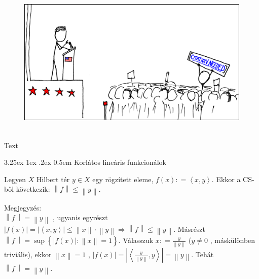 \documentclass[12pt,a4paper]{scrartcl}
\makeatletter
\renewcommand\paragraph{\@startsection{paragraph}{4}{\z@}%
                                    {3.25ex \@plus1ex \@minus.2ex}%
                                    {0.5em} %
                                    {\normalfont\normalsize\bfseries}}
\newenvironment{megjegyzes}{}{}
\newenvironment{ajanlofig}{\begin{figure}\begin{center}}{
\end{center}\end{figure}}
\makeatother
\begin{document}
\begin{ajanlo}

\begin{ajanlofig}

\href{https://xkcd.com}{\includegraphics[width=5.20833in,height=2.82292in]{wikipedian_protester.png}}

\end{ajanlofig}

Text

\end{ajanlo}

\hypertarget{korlatos-linearis-funkcionalok}{%
\paragraph{Korlátos lineáris
funkcionálok}\label{korlatos-linearis-funkcionalok}}

Legyen \(X\) Hilbert tér \(y \in X\) egy rögzített eleme,
\(f\left( x \right): = \left\langle {x,y} \right\rangle\). Ekkor a
CS-ből következik: \(\left\| f \right\| \leq \left\| y \right\|\).

\begin{megjegyzes}

Megjegyzés:\\
\(\left\| f \right\| = \left\| y \right\|\) , ugyanis egyrészt
\(\left. \left| {f\left( x \right)} \right| = \left| \left\langle {x,y} \right\rangle \right| \leq \left\| x \right\| \cdot \left\| y \right\|\Rightarrow\left\| f \right\| \leq \left\| y \right\| \right.\).
Másrészt
\(\left\| f \right\| = \sup\left\{ {\left| {f\left( x \right)} \right|:\left\| x \right\| = 1} \right\}\).
Válasszuk \(x: = \frac{y}{\left\| y \right\|}\) (\(y \neq 0\) ,
máskülönben triviális), ekkor \(\left\| x \right\| = 1\) ,
\(\left| {f\left( x \right)} \right| = \left| \left\langle {\frac{y}{\left\| y \right\|},y} \right\rangle \right| = \left\| y \right\|\).
Tehát \(\left\| f \right\| = \left\| y \right\|\).

\end{megjegyzes}
\end{document}
